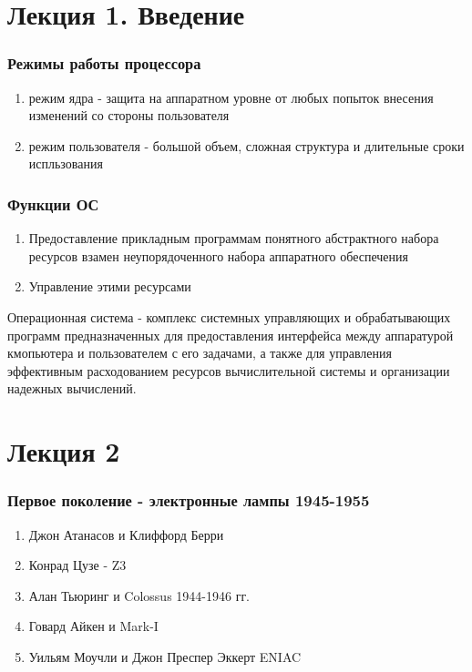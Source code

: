 \documentclass[a4paper]{article}
\begin{document}
\section{Лекция 1. Введение}

\subsubsection{Режимы работы процессора}
\begin{enumerate}
\item режим ядра - защита на аппаратном уровне от любых попыток внесения изменений со стороны пользователя
\item режим пользователя - большой объем, сложная структура и длительные сроки испльзования
\end{enumerate}

\subsubsection{Функции ОС}
\begin{enumerate}
\item Предоставление прикладным программам понятного абстрактного набора ресурсов взамен неупорядоченного набора аппаратного обеспечения
\item Управление этими ресурсами
\end{enumerate}

Операционная система - комплекс системных управляющих и обрабатывающих программ предназначенных для предоставления интерфейса между аппаратурой кмопьютера и пользователем с его задачами, а также для управления эффективным расходованием ресурсов вычислительной системы и организации надежных вычислений.

\section{Лекция 2}

\subsubsection{Первое поколение - электронные лампы 1945-1955}
\begin{enumerate}
\item Джон Атанасов и Клиффорд Берри
\item Конрад Цузе - Z3
\item Алан Тьюринг и Colossus 1944-1946 гг.
\item Говард Айкен и Mark-I
\item Уильям Моучли и Джон Преспер Эккерт ENIAC
\end{enumerate}
\end{document}
